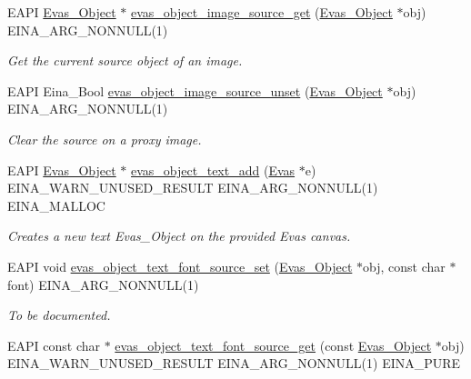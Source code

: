\begin{DoxyCompactItemize}
EAPI \hyperlink{group__Evas__Object__Group_ga9e19e6dd1f517a0ba437c0114d3e7c97}{Evas\_\-Object} $\ast$ \hyperlink{group__Evas__Object__Image_ga95a96ced932d6e7e17ee019654d9d901}{evas\_\-object\_\-image\_\-source\_\-get} (\hyperlink{group__Evas__Object__Group_ga9e19e6dd1f517a0ba437c0114d3e7c97}{Evas\_\-Object} $\ast$obj) EINA\_\-ARG\_\-NONNULL(1)
\begin{DoxyCompactList}\small\item\em Get the current source object of an image. \item\end{DoxyCompactList}\item 
EAPI Eina\_\-Bool \hyperlink{group__Evas__Object__Image_gad667fc9de032eb39bf07e33ef0f4d81b}{evas\_\-object\_\-image\_\-source\_\-unset} (\hyperlink{group__Evas__Object__Group_ga9e19e6dd1f517a0ba437c0114d3e7c97}{Evas\_\-Object} $\ast$obj) EINA\_\-ARG\_\-NONNULL(1)
\begin{DoxyCompactList}\small\item\em Clear the source on a proxy image. \item\end{DoxyCompactList}\item 
EAPI \hyperlink{group__Evas__Object__Group_ga9e19e6dd1f517a0ba437c0114d3e7c97}{Evas\_\-Object} $\ast$ \hyperlink{group__Evas__Object__Text_ga2da9ad20aec514dfeecb97c715e7f539}{evas\_\-object\_\-text\_\-add} (\hyperlink{group__Evas__Canvas_ga5ff87cc4ce6bc43e3b640a6d37f73043}{Evas} $\ast$e) EINA\_\-WARN\_\-UNUSED\_\-RESULT EINA\_\-ARG\_\-NONNULL(1) EINA\_\-MALLOC
\begin{DoxyCompactList}\small\item\em Creates a new text {\ttfamily Evas\_\-Object} on the provided {\ttfamily Evas} canvas. \item\end{DoxyCompactList}\item 
EAPI void \hyperlink{group__Evas__Object__Text_ga6f503ac55e126bebbadf96a152f5d02b}{evas\_\-object\_\-text\_\-font\_\-source\_\-set} (\hyperlink{group__Evas__Object__Group_ga9e19e6dd1f517a0ba437c0114d3e7c97}{Evas\_\-Object} $\ast$obj, const char $\ast$font) EINA\_\-ARG\_\-NONNULL(1)
\begin{DoxyCompactList}\small\item\em To be documented. \item\end{DoxyCompactList}\item 
EAPI const char $\ast$ \hyperlink{group__Evas__Object__Text_gaa48bece59070032504a2c78ad8a66577}{evas\_\-object\_\-text\_\-font\_\-source\_\-get} (const \hyperlink{group__Evas__Object__Group_ga9e19e6dd1f517a0ba437c0114d3e7c97}{Evas\_\-Object} $\ast$obj) EINA\_\-WARN\_\-UNUSED\_\-RESULT EINA\_\-ARG\_\-NONNULL(1) EINA\_\-PURE

\end{DoxyCompactItemize}
